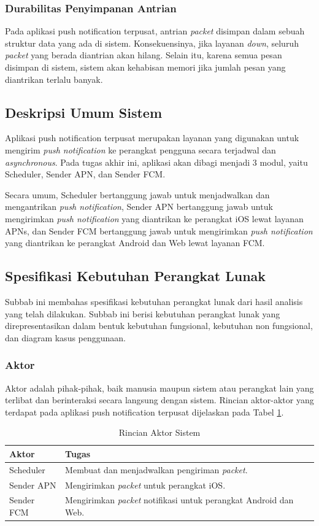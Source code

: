 \subsubsection{Durabilitas Penyimpanan Antrian}
\par Pada aplikasi push notification terpusat, antrian \textit{packet} disimpan dalam sebuah struktur data yang ada di sistem. Konsekuensinya, jika layanan \textit{down}, seluruh \textit{packet} yang berada diantrian akan hilang. Selain itu, karena semua pesan disimpan di sistem, sistem akan kehabisan memori jika jumlah pesan yang diantrikan terlalu banyak.

\subsection{Deskripsi Umum Sistem}
\par Aplikasi push notification terpusat merupakan layanan yang digunakan untuk mengirim \textit{push notification} ke perangkat pengguna secara terjadwal dan \textit{asynchronous}. Pada tugas akhir ini, aplikasi akan dibagi menjadi 3 modul, yaitu Scheduler, Sender APN, dan Sender FCM.
\par Secara umum, Scheduler bertanggung jawab untuk menjadwalkan dan mengantrikan \textit{push notification}, Sender APN bertanggung jawab untuk mengirimkan \textit{push notification} yang diantrikan ke perangkat iOS lewat layanan APNs, dan Sender FCM bertanggung jawab untuk mengirimkan \textit{push notification} yang diantrikan ke perangkat Android dan Web lewat layanan FCM.

\subsection{Spesifikasi Kebutuhan Perangkat Lunak}
\par Subbab ini membahas spesifikasi kebutuhan perangkat lunak dari hasil analisis yang telah dilakukan. Subbab ini berisi kebutuhan perangkat lunak yang direpresentasikan dalam bentuk kebutuhan fungsional, kebutuhan non fungsional, dan diagram kasus penggunaan.

\subsubsection{Aktor}
\par Aktor adalah pihak-pihak, baik manusia maupun sistem atau perangkat lain yang terlibat dan berinteraksi secara langsung dengan sistem. Rincian aktor-aktor yang terdapat pada aplikasi push notification terpusat dijelaskan pada Tabel \ref{t:aktor}.
\begin{longtable}{|p{2cm}|p{7cm}|}
    \caption{Rincian Aktor Sistem} \label{t:aktor} \\ \hline
    \rowcolor{lightgray} Aktor & Tugas \\ \hline
    Scheduler & Membuat dan menjadwalkan pengiriman \textit{packet}. \\ \hline
    Sender APN & Mengirimkan \textit{packet} untuk perangkat iOS. \\ \hline
    Sender FCM & Mengirimkan \textit{packet} notifikasi untuk perangkat Android dan Web. \\ \hline
\end{longtable}

